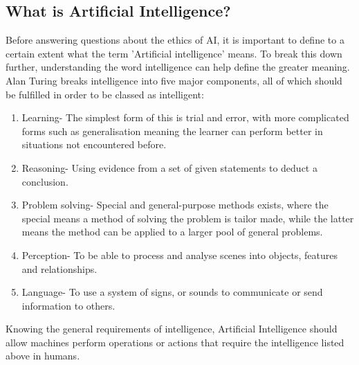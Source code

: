 \documentclass[article]{IEEEtran}
\begin{document}
\subsection{What is Artificial Intelligence?}
Before answering questions about the ethics of AI, it is important to define to a certain extent what the term 'Artificial intelligence' means. To break this down further, understanding the word intelligence can help define the greater meaning. Alan Turing \cite{Alan Turing website} breaks intelligence into five major components, all of which should be fulfilled in order to be classed as intelligent:
\begin{enumerate}
\item Learning- The simplest form of this is trial and error, with more complicated forms such as generalisation meaning the learner can perform better in situations not encountered before.
\item Reasoning- Using evidence from a set of given statements to deduct a conclusion.
\item Problem solving- Special and general-purpose methods exists, where the special means a method of solving the problem is tailor made, while the latter means the method can be applied to a larger pool of general problems.	
\item Perception- To be able to process and analyse scenes into objects, features and relationships.
\item Language- To use a system of signs, or sounds to communicate or send information to others. 
\end{enumerate}
Knowing the general requirements of intelligence, Artificial Intelligence should allow machines perform operations or actions that require the intelligence listed above in humans.
\end{document}
